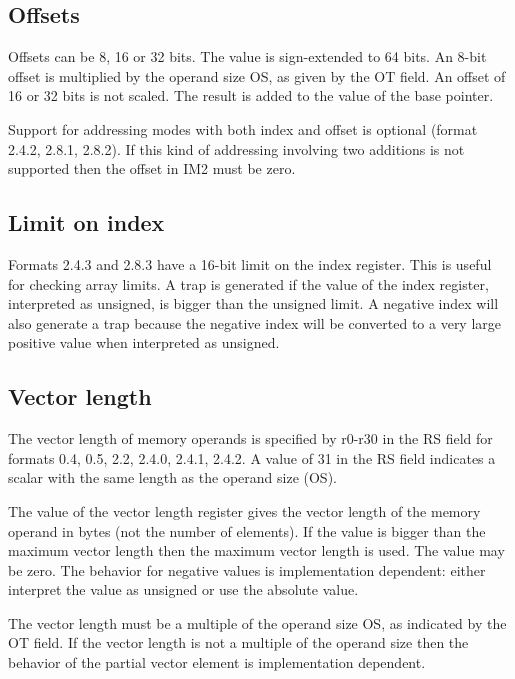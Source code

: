 \documentclass[forwardcom.tex]{subfiles}
\begin{document}
\subsection{Offsets}
Offsets can be 8, 16 or 32 bits. The value is sign-extended to 64 bits. An 8-bit offset is multiplied by the operand size OS, as given by the OT field. An offset of 16 or 32 bits is not scaled. The result is added to the value of the base pointer.
\vspace{2mm}

Support for addressing modes with both index and offset is optional (format 2.4.2, 2.8.1, 2.8.2). If this kind of addressing involving two additions is not supported then the offset in IM2 must be zero.

\subsection{Limit on index}
Formats 2.4.3 and 2.8.3 have a 16-bit limit on the index register. This is useful for checking array limits. A trap is generated if the value of the index register, interpreted as unsigned, is bigger than the unsigned limit. A negative index will also generate a trap because the negative index will be converted to a very large positive value when interpreted as unsigned.

\subsection{Vector length}
The vector length of memory operands is specified by r0-r30 in the RS field for formats 0.4, 0.5, 2.2, 2.4.0, 2.4.1, 2.4.2. A value of 31 in the RS field indicates a scalar with the same length as the operand size (OS).
\vspace{2mm}

The value of the vector length register gives the vector length of the memory operand in bytes (not the number of elements). If the value is bigger than the maximum vector length then the maximum vector length is used. The value may be zero. The behavior for negative values is implementation dependent: either interpret the value as unsigned or use the absolute value.
\vspace{2mm}

The vector length must be a multiple of the operand size OS, as indicated by the OT field. If the vector length is not a multiple of the operand size then the behavior of the partial vector element is implementation dependent.
\vspace{2mm}
\end{document}
